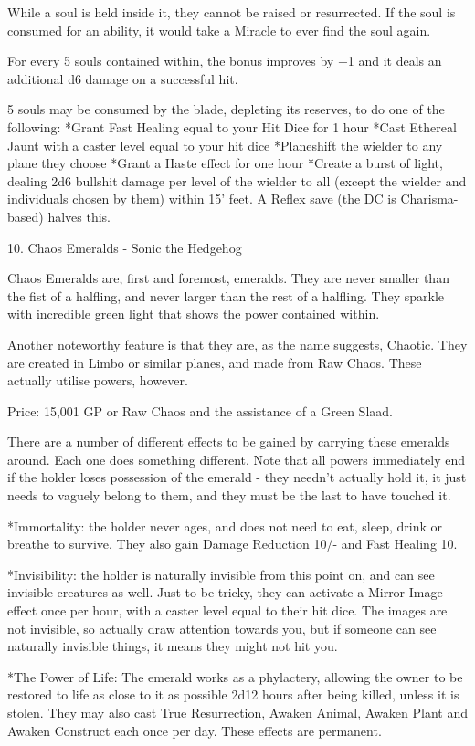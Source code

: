\begin{multicols}{2}
While a soul is held inside it, they cannot be raised or resurrected. If the soul is consumed for an ability, it would take a Miracle to ever find the soul again.

For every 5 souls contained within, the bonus improves by +1 and it deals an additional d6 damage on a successful hit.

5 souls may be consumed by the blade, depleting its reserves, to do one of the following:
*Grant Fast Healing equal to your Hit Dice for 1 hour
*Cast Ethereal Jaunt with a caster level equal to your hit dice
*Planeshift the wielder to any plane they choose
*Grant a Haste effect for one hour
*Create a burst of light, dealing 2d6 bullshit damage per level of the wielder to all (except the wielder and individuals chosen by them) within 15' feet. A Reflex save (the DC is Charisma-based) halves this.


10. Chaos Emeralds - Sonic the Hedgehog

Chaos Emeralds are, first and foremost, emeralds. They are never smaller than the fist of a halfling, and never larger than the rest of a halfling. They sparkle with incredible green light that shows the power contained within.

Another noteworthy feature is that they are, as the name suggests, Chaotic. They are created in Limbo or similar planes, and made from Raw Chaos. These actually utilise powers, however.

Price: 15,001 GP or Raw Chaos and the assistance of a Green Slaad.

There are a number of different effects to be gained by carrying these emeralds around. Each one does something different. Note that all powers immediately end if the holder loses possession of the emerald - they needn't actually hold it, it just needs to vaguely belong to them, and they must be the last to have touched it.

*Immortality: the holder never ages, and does not need to eat, sleep, drink or breathe to survive. They also gain Damage Reduction 10/- and Fast Healing 10.

*Invisibility: the holder is naturally invisible from this point on, and can see invisible creatures as well. Just to be tricky, they can activate a Mirror Image effect once per hour, with a caster level equal to their hit dice. The images are not invisible, so actually draw attention towards you, but if someone can see naturally invisible things, it means they might not hit you.

*The Power of Life: The emerald works as a phylactery, allowing the owner to be restored to life as close to it as possible 2d12 hours after being killed, unless it is stolen. They may also cast True Resurrection, Awaken Animal, Awaken Plant and Awaken Construct each once per day. These effects are permanent.


\end{multicols}
